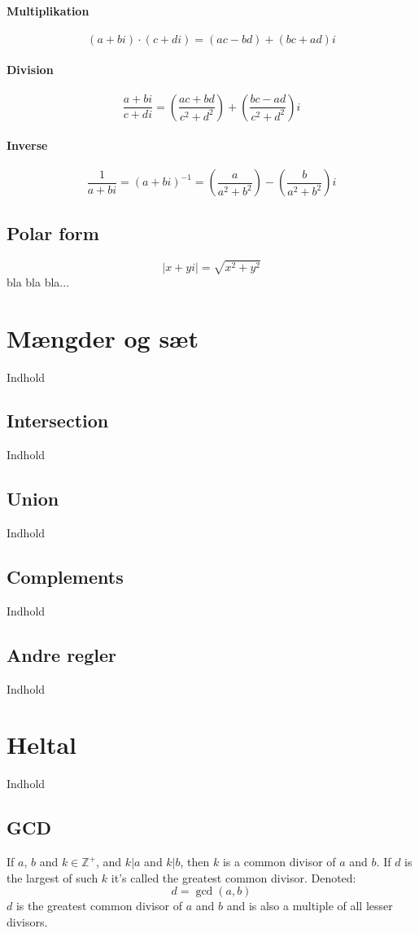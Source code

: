\documentclass[a4paper]{article}
\newcommand{\Integers}{\mathbb{Z}}
\begin{document}
  \paragraph{Multiplikation}
   $$(a + bi) \cdot (c + di) = (ac - bd) + (bc + ad)i$$
  \paragraph{Division}
   $$\frac{a + bi}{c + di} = \left(\frac{ac + bd}{c^2 + d^2}\right) + \left(\frac{bc - ad}{c^2 + d^2}\right)i$$
  \paragraph{Inverse} %
   $$\frac{1}{a + bi} = (a + bi)^{-1} = \left(\frac{a}{a^2 + b^2}\right) - \left(\frac{b}{a^2 + b^2}\right)i$$
 \subsection{Polar form}
  $$|x + yi| = \sqrt{x^2 + y^2}$$
  bla bla bla...


\section{Mængder og sæt}
  Indhold
  \subsection{Intersection}
    Indhold
  \subsection{Union}
    Indhold
  \subsection{Complements}
    Indhold
  \subsection{Andre regler}
    Indhold
\section{Heltal}
  Indhold
  \subsection{GCD}
    If $a$, $b$ and $k \in \Integers^+$, and $k | a$ and $k | b$, then $k$ is a common divisor of $a$ and $b$. If $d$ is the largest of such $k$ it's called the greatest common divisor. Denoted:
    $$d = \operatorname{gcd}(a, b)$$
    $d$ is the greatest common divisor of $a$ and $b$ and is also a multiple of all lesser divisors.
\end{document}

